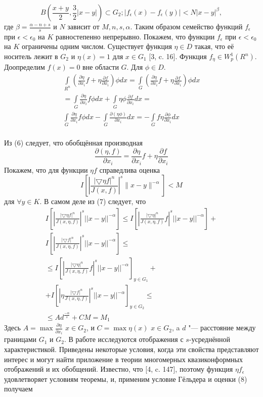 $$
B\left(\frac{x+y}{2},\frac{3}{2}|x-y|\right)\subset G_{2}; |f_{\epsilon}(x)-f_{\epsilon}(y)|<N|x-y|^\beta,
$$
где $\beta=\frac{\alpha-n+s}{s}$ и $N$ зависит от $M,n,s,\alpha$.
Таким образом семейство функций $f_\epsilon$ при $\epsilon<\epsilon_0$ на $K$ равностепенно непрерывно. Покажем, что функции $f_\epsilon$ при $\epsilon<\epsilon_0$ на $K$ ограничены одним числом. Существует функция $\eta\in D$ такая, что её носитель лежит в $G_2$ и $\eta(x)=1$ для $x\in G_1$ [3, c. 16]. Функция $f_{\eta}\in W_{p}^{1} (R^n)$. Доопределим $f(x)=0$ вне области $G$. Для $\phi\in D$.
\begin{multline}
\int\limits_{R^n}\left(\frac{\partial\eta}{\partial x_i}f+\eta\frac{\partial f}{\partial x_i}\right)\phi dx
= \int\limits_{G}\left(\frac{\partial\eta}{\partial x_i}f+\eta\frac{\partial f}{\partial x_i}\right)\phi dx\\
=\int\limits_{G}\frac{\partial\eta}{\partial x_i}f\phi dx+\int\limits_{G}\eta\phi\frac{\partial f}{\partial x_i}dx=\\
\int\limits_{G}\frac{\partial\eta}{\partial x_i}f\phi dx-\int\limits_{G}\frac{\partial(\eta\phi)}{\partial x_i}dx=-\int\limits_{G}f\eta\frac{\partial\phi}{\partial x_i}dx\\
\end{multline}


Из (6) следует, что обобщённая производная
\begin{equation}
\frac{\partial(\eta,f)}{\partial x_i}=\frac{\partial\eta}{\partial x_i}f+\eta\frac{\partial f}{\partial x_i}
\end{equation}
Покажем, что для функции $\eta f$ справедлива оценка
$$
I\left[\left|\frac{|\bigtriangledown\eta f|^{n}}{J(x,f)}
\right|^{s}\|x-y\|^{-\alpha}\right]<M
$$
для $\forall y\in K$. В самом деле из (7) следует, что
\begin{multline}
I\left[\left|\frac{|\bigtriangledown\eta f|^{n}}{J(x,\eta,f)}
\right|^{s}||x-y||^{-\alpha}\right]\leq I\left[\left|\frac{|\bigtriangledown\eta|^{n}}{J(x,\eta,f)}f
\right|^{s}||x-y||^{-\alpha}\right]+\\I\left[\left|\frac{|\bigtriangledown f|^{n}}{J(x,\eta,f)}
\right|^{s}||x-y||^{-\alpha}\right]
\leq
\\
\leq I\left[\left|\frac{|\bigtriangledown\eta|^{n}}{J(x,\eta,f)}f
\right|^{s}||x-y||^{-\alpha}\right]_{y\in G_1}+
\\+
I\left[\left|\eta\frac{|\bigtriangledown f|^{n}}{J(x,\eta,f)}
\right|^{s}||x-y||^{-\alpha}\right]_{y\in G_2}\leq\\\leq Ad^{\frac{-\alpha}{s}}+CM=M_1
\end{multline}
Здесь $A=\max\frac{\partial\eta}{\partial x_i}$ $x\in G_2$, и $C=\max\eta(x)$ $x\in G_2$, a $d$ "--- расстояние между границами $G_1$ и $G_2$. В работе исследуются отображения с $s$-усреднённой характеристикой. Приведены некоторые условия, когда эти свойства представляют интерес и могут найти приложение в теории многомерных квазиконформных отображений и их обобщений.
 Известно, что [4, c. 147], поэтому функция $\eta f_\epsilon$ удовлетворяет условиям теоремы, и, применим условие Гёльдера и оценки (8) получаем

